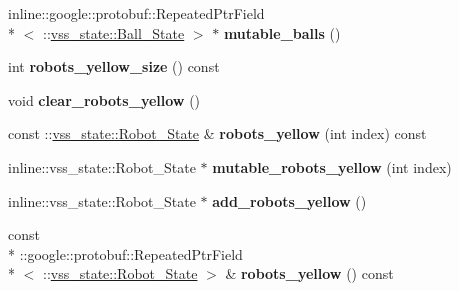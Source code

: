 \begin{DoxyCompactItemize}
\item 
\hypertarget{classvss__state_1_1Global__State_a47fa3f079e92555b8d86ef916def763e}{inline\-::google\-::protobuf\-::\-Repeated\-Ptr\-Field\\*
$<$ \-::\hyperlink{classvss__state_1_1Ball__State}{vss\-\_\-state\-::\-Ball\-\_\-\-State} $>$ $\ast$ {\bfseries mutable\-\_\-balls} ()}\label{classvss__state_1_1Global__State_a47fa3f079e92555b8d86ef916def763e}

\item 
\hypertarget{classvss__state_1_1Global__State_ad9605aa1df1cc1a30adc6a88bd85f34f}{int {\bfseries robots\-\_\-yellow\-\_\-size} () const }\label{classvss__state_1_1Global__State_ad9605aa1df1cc1a30adc6a88bd85f34f}

\item 
\hypertarget{classvss__state_1_1Global__State_a5519565ece84f3f429aa692217fff1f6}{void {\bfseries clear\-\_\-robots\-\_\-yellow} ()}\label{classvss__state_1_1Global__State_a5519565ece84f3f429aa692217fff1f6}

\item 
\hypertarget{classvss__state_1_1Global__State_a311a39a8f7be0721ebb684b9bc286ce2}{const \-::\hyperlink{classvss__state_1_1Robot__State}{vss\-\_\-state\-::\-Robot\-\_\-\-State} \& {\bfseries robots\-\_\-yellow} (int index) const }\label{classvss__state_1_1Global__State_a311a39a8f7be0721ebb684b9bc286ce2}

\item 
\hypertarget{classvss__state_1_1Global__State_a040f90d8bad2e783b1e91077a7c79234}{inline\-::vss\-\_\-state\-::\-Robot\-\_\-\-State $\ast$ {\bfseries mutable\-\_\-robots\-\_\-yellow} (int index)}\label{classvss__state_1_1Global__State_a040f90d8bad2e783b1e91077a7c79234}

\item 
\hypertarget{classvss__state_1_1Global__State_aecf340a8be8a26db65bd29ebafcbf1d6}{inline\-::vss\-\_\-state\-::\-Robot\-\_\-\-State $\ast$ {\bfseries add\-\_\-robots\-\_\-yellow} ()}\label{classvss__state_1_1Global__State_aecf340a8be8a26db65bd29ebafcbf1d6}

\item 
\hypertarget{classvss__state_1_1Global__State_ad18fe89214728e2c808c8911575ab90b}{const \\*
\-::google\-::protobuf\-::\-Repeated\-Ptr\-Field\\*
$<$ \-::\hyperlink{classvss__state_1_1Robot__State}{vss\-\_\-state\-::\-Robot\-\_\-\-State} $>$ \& {\bfseries robots\-\_\-yellow} () const }\label{classvss__state_1_1Global__State_ad18fe89214728e2c808c8911575ab90b}


\end{DoxyCompactItemize}
